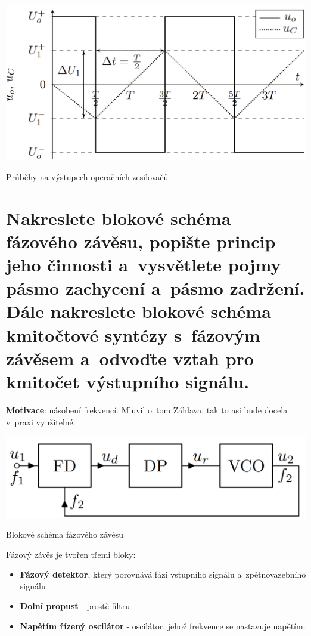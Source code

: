 \documentclass[a4paper,12pt]{article}   %
\begin{document}
\begin{graf}[h!]
    \centering
    \includegraphics[width = .75\textwidth]{gen_funct-graf.PNG}
    \caption{Průběhy na výstupech operačních zesilovačů}
    \label{graf:gen:fci}
\end{graf}









\section{Nakreslete blokové schéma fázového závěsu, popište princip jeho činnosti a~vysvětlete pojmy pásmo zachycení a~pásmo zadržení. Dále nakreslete blokové schéma kmitočtové syntézy s~fázovým závěsem a~odvoďte vztah pro kmitočet výstupního signálu.}
\textbf{Motivace}: násobení frekvencí. Mluvil o~tom Záhlava, tak to asi bude docela v~praxi využitelné.

\begin{schema}[h!]
    \centering
    \includegraphics[width=.6\textwidth]{fazovy_zaves.PNG}
    \caption{Blokové schéma fázového závěsu}
    \label{sch:faz:zaves}
\end{schema}

Fázový závěs je tvořen třemi bloky:
\begin{itemize}
    \item \textbf{Fázový detektor}, který porovnává fázi vstupního signálu a~zpětnovazebního signálu
    \item \textbf{Dolní propust} - prostě filtru
    \item \textbf{Napětím řízený oscilátor} - oscilátor, jehož frekvence se nastavuje napětím.
\end{itemize}
\end{document}
